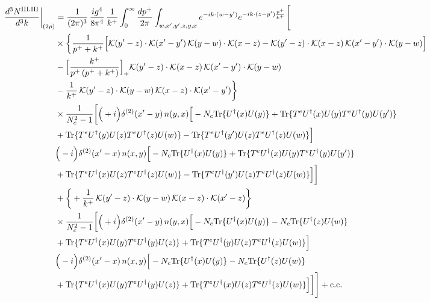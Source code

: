 \documentclass[9pt]{article}
\numberwithin{equation}{section}
\begin{document}
\begin{align}
\frac{d^{3}N^{\rm III.III}}{d^{3}k}\bigg|_{(2\rho)}&=\frac{1}{(2\pi)^{3}}\,\frac{ig^{4}}{8\pi^{4}}\,\frac{1}{k^{+}}\int_{0}^{\infty}\frac{dp^{+}}{2\pi}\int_{w,x',y',z,y,x}e^{-ik\cdot(w-y')}e^{-ik\cdot(z-y')\frac{p^{+}}{k^{+}}}\Bigg[\notag\\
&\times\bigg\{\frac{1}{p^{+}+k^{+}}\Big[\mathcal{K}(y'-z)\cdot\mathcal{K}(x'-y')\,\mathcal{K}(y-w)\cdot\mathcal{K}(x-z)-\mathcal{K}(y'-z)\cdot\mathcal{K}(x-z)\,\mathcal{K}(x'-y')\cdot\mathcal{K}(y-w)\Big]\notag\\
&-\Big[\frac{k^{+}}{p^{+}\,(p^{+}+k^{+})}\Big]_{+}\mathcal{K}(y'-z)\cdot\mathcal{K}(x-z)\,\mathcal{K}(x'-y')\cdot\mathcal{K}(y-w)\notag\\
&-\frac{1}{k^{+}}\,\mathcal{K}(y'-z)\cdot\mathcal{K}(y-w)\,\mathcal{K}(x-z)\cdot\mathcal{K}(x'-y')\bigg\}\notag\\
&\times \frac{1}{N_{c}^{2}-1}\bigg[\Big(+i\Big)\delta^{(2)}(x'-y)\,n(y,x)\Big[-N_{c}{\rm Tr}\{U^{\dagger}(x)U(y)\}+{\rm Tr}\{T^{e}U^{\dagger}(x)U(y)T^{e}U^{\dagger}(y)U(y')\}\notag\\
& +{\rm Tr}\{T^{e}U^{\dagger}(y)U(z)T^{e}U^{\dagger}(z)U(w)\}-{\rm Tr}\{T^{e}U^{\dagger}(y')U(z)T^{e}U^{\dagger}(z)U(w)\}\Big]\notag\\
& \Big(-i\Big)\delta^{(2)}(x'-x)\,n(x,y)\Big[-N_{c}{\rm Tr}\{U^{\dagger}(x)U(y)\}+{\rm Tr}\{T^{e}U^{\dagger}(x)U(y)T^{e}U^{\dagger}(y)U(y')\}\notag\\
& +{\rm Tr}\{T^{e}U^{\dagger}(x)U(z)T^{e}U^{\dagger}(z)U(w)\}-{\rm Tr}\{T^{e}U^{\dagger}(y')U(z)T^{e}U^{\dagger}(z)U(w)\}\Big]\bigg]\notag\\
&+\bigg\{+\frac{1}{k^{+}}\,\mathcal{K}(y'-z)\cdot\mathcal{K}(y-w)\,\mathcal{K}(x-z)\cdot\mathcal{K}(x'-z)\bigg\}\notag\\
&\times \frac{1}{N_{c}^{2}-1}\bigg[\Big(+i\Big)\delta^{(2)}(x'-y)\,n(y,x)\Big[-N_{c}{\rm Tr}\{U^{\dagger}(x)U(y)\}-N_{c}{\rm Tr}\{U^{\dagger}(z)U(w)\}\notag\\
& +{\rm Tr}\{T^{e}U^{\dagger}(x)U(y)T^{e}U^{\dagger}(y)U(z)\}+{\rm Tr}\{T^{e}U^{\dagger}(y)U(z)T^{e}U^{\dagger}(z)U(w)\}\Big]\notag\\
& \Big(-i\Big)\delta^{(2)}(x'-x)\,n(x,y)\Big[-N_{c}{\rm Tr}\{U^{\dagger}(x)U(y)\}-N_{c}{\rm Tr}\{U^{\dagger}(z)U(w)\}\notag\\
& +{\rm Tr}\{T^{e}U^{\dagger}(x)U(y)T^{e}U^{\dagger}(y)U(z)\}+{\rm Tr}\{T^{e}U^{\dagger}(x)U(z)T^{e}U^{\dagger}(z)U(w)\}\Big]\bigg]\Bigg]+{\rm c.c.}\label{eq:E-III.III-2}
\end{align}
\end{document}
